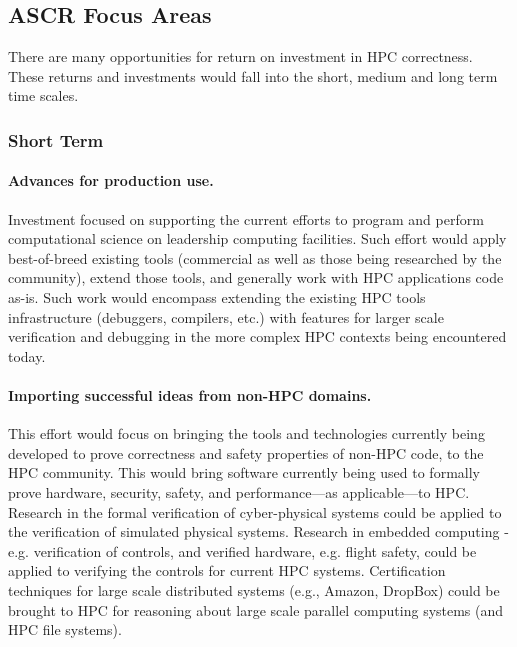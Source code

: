 

\subsection{ASCR Focus Areas}

There are many opportunities for return on investment in HPC correctness.  These returns and investments would fall into the short, medium and long term time scales.

\subsubsection{Short Term}

\paragraph{Advances for production use.}
Investment focused on supporting the current efforts to program and perform computational science on leadership computing facilities.  Such effort would apply best-of-breed existing tools (commercial as well as those being researched by the community), extend those tools, and generally work with HPC applications code as-is.  Such work would encompass extending the existing HPC tools infrastructure (debuggers, compilers, etc.) with features for larger scale verification and debugging in the more complex HPC contexts being encountered today.


\paragraph{Importing successful ideas from non-HPC domains.}
This effort would focus on bringing the tools and technologies currently being developed to prove correctness and safety properties of non-HPC code, to the HPC community.  This would bring software currently being used to formally prove hardware, security, safety, and performance---as applicable---to HPC.  Research in the formal verification of cyber-physical systems could be applied to the verification of simulated physical systems.  Research in embedded computing - e.g. verification of controls, and verified hardware, e.g. flight safety, could be applied to verifying the controls for current HPC systems.  Certification techniques for large scale distributed systems (e.g., Amazon, DropBox) could be brought to HPC for reasoning about large scale parallel computing systems (and HPC file systems).

